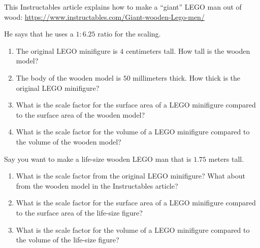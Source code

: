 \documentclass[handout,nooutcomes,noauthor,hints]{ximera}
\begin{document}
\mynewpage
\begin{question}
 This Instructables article explains how to make a ``giant'' LEGO man
 out of wood:
 \url{https://www.instructables.com/Giant-wooden-Lego-men/}
 
 He says that he uses a $1:6.25$ ratio for the scaling. 
 
\begin{enumerate}
 \item The original LEGO minifigure is $4$ centimeters tall. How tall is the
   wooden model?
 \item The body of the wooden model is $50$ millimeters thick. How
   thick is the original LEGO minifigure?
 \item What is the scale factor for the surface area of a LEGO
   minifigure compared to the surface area of the wooden model?
 \item What is the scale factor for the volume of a LEGO
   minifigure compared to the volume of the wooden model?
 
\end{enumerate}
\end{question}
\mynewpage

\begin{question}
 Say you want to make a life-size wooden LEGO man that is $1.75$
 meters tall.
 
\begin{enumerate}
 \item What is the scale factor from the original LEGO minifigure?
   What about from the wooden model in the Instructables article?
 \item What is the scale factor for the surface area of a LEGO
   minifigure compared to the surface area of the life-size figure?
 \item What is the scale factor for the volume of a LEGO
   minifigure compared to the volume of the life-size figure?
\end{enumerate}
 \end{question}
\mynewpage
\end{document}
